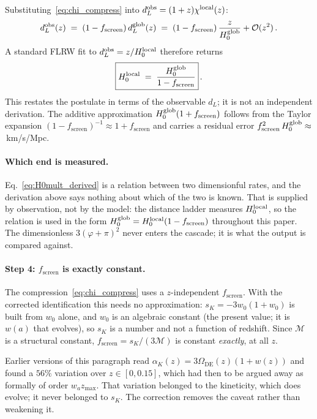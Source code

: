 \documentclass[12pt,a4paper]{article}
\newcommand{\phiG}{\varphi}
\newcommand{\MIRA}{\mathcal{M}}
\newcommand{\Omde}{\Omega_{\mathrm{DE}}}  %
\newcommand{\fsc}{f_{\mathrm{screen}}}
\newcommand{\sK}{s_K}          %
\newcommand{\alphaK}{\alpha_K}     %
\renewcommand{\Omega}{\varOmega}
\begin{document}
Substituting~\eqref{eq:chi_compress} into $d_L^{\rm obs} = (1+z)\chi^{\rm local}(z)$:
\begin{equation}
  d_L^{\rm obs}(z) \;=\; (1-\fsc)\,d_L^{\rm glob}(z)
                   \;=\; (1-\fsc)\,\frac{z}{H_0^{\rm glob}}
                         + \mathcal{O}(z^2)\,.
  \label{eq:dL_SSEE}
\end{equation}
A standard FLRW fit to $d_L^{\rm obs} = z/H_0^{\rm local}$ therefore returns
\begin{equation}
  \boxed{H_0^{\rm local} \;=\; \frac{H_0^{\rm glob}}{1-\fsc}}\,.
  \label{eq:H0mult_derived}
\end{equation}
This restates the postulate in terms of the observable $d_L$; it is not an independent derivation.
The additive approximation $H_0^{\rm glob}(1+\fsc)$ follows from the
Taylor expansion $(1-\fsc)^{-1}\approx 1+\fsc$ and carries a residual
error $\fsc^2\,H_0^{\rm glob} \approx \val{p9_add_dif}$\,km/s/Mpc.

\paragraph{Which end is measured.}
Eq.~\eqref{eq:H0mult_derived} is a relation between two dimensionful rates,
and the derivation above says nothing about which of the two is known. That is
supplied by observation, not by the model: the distance ladder measures
$H_0^{\rm local}$, so the relation is used in the form
$H_0^{\rm glob} = H_0^{\rm local}(1-\fsc)$ throughout this paper. The
dimensionless $3(\phiG+\pi)^2$ never enters the cascade; it is what the output
is compared against.

\paragraph{Step 4: $\fsc$ is exactly constant.}
\label{sec:step4}

The compression~\eqref{eq:chi_compress} uses a $z$-independent $\fsc$.  With
the corrected identification this needs no approximation: $\sK = -3w_0(1+w_0)$
is built from $w_0$ alone, and $w_0$ is an algebraic constant (the present
value; it is $w(a)$ that evolves), so $\sK$ is a number and not a function of
redshift.  Since $\MIRA$ is a structural
constant, $\fsc = \sK/(3\MIRA)$ is constant \emph{exactly}, at all $z$.

Earlier versions of this paragraph read $\alphaK(z) = 3\Omde(z)(1+w(z))$ and
found a $56\%$ variation over $z\in[0,0.15]$, which had then to be argued away
as formally of order $w_a z_{\max}$.  That variation belonged to the
kineticity, which does evolve; it never belonged to $\sK$.  The correction
removes the caveat rather than weakening it.
\end{document}
